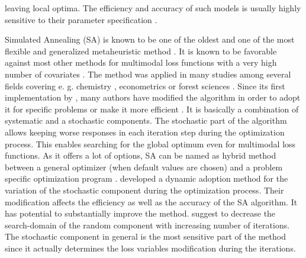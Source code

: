 leaving local optima. The efficiency and accuracy of such models is usually highly sensitive to their parameter specification \citep{corana_1987}.

Simulated Annealing (SA) \citep{kirkpatrick_1983} is known to be one of the oldest and one of the most flexible and generalized metaheuristic method \citep{blum_2003}. It is known to be favorable against most other methods for multimodal loss functions with a very high number of covariates \citep{corana_1987}. The method was applied in many studies among several fields covering e. g. chemistry \citep{agostini_2006}, econometrics \citep{ingber_1993} or forest sciences \citep{baskent_2002}. Since its first implementation by \citet{kirkpatrick_1983}, many authors have modified the algorithm in order to adopt it for specific problems \citep[e. g.][]{desarbo_1989, goffe_1996} or make it more efficient \citep[e. g.][]{xiang_2013}. It is basically a combination of systematic and a stochastic components. The stochastic part of the algorithm allows keeping worse responses in each iteration step during the optimization process. This enables searching for the global optimum even for multimodal loss functions. As it offers a lot of options, SA can be named as hybrid method between a general optimizer (when default values are chosen) and a problem specific optimization program \citep{wegener_2005}. \citet{corana_1987} developed a dynamic adoption method for the variation of the stochastic component during the optimization process. Their modification affects the efficiency as well as the accuracy of the SA algorithm. It has potential to substantially improve the method. \citet{pronzato_1984} suggest to decrease the search-domain of the random component with increasing number of iterations. The stochastic component in general is the most sensitive part of the method since it actually determines the loss variables modification during the iterations.

